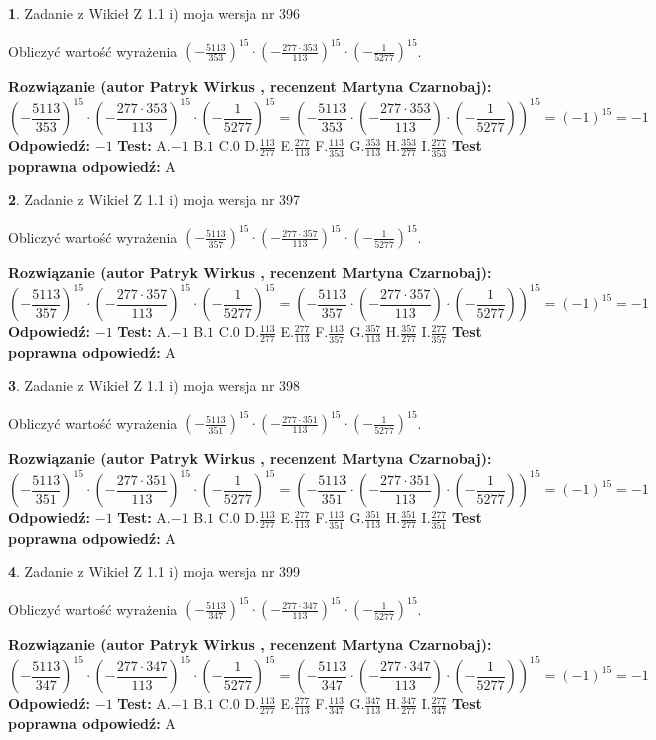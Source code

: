 \documentclass[12pt, a4paper]{article}
\theoremstyle{definition} %
\newtheorem{zad}{}
\newcommand{\zadStart}[1]{\begin{zad}#1\newline}
\newcommand{\zadStop}{\end{zad}}
\newcommand{\rozwStart}[2]{\noindent \textbf{Rozwiązanie (autor #1 , recenzent #2): }\newline}
\newcommand{\rozwStop}{\newline}
\newcommand{\odpStart}{\noindent \textbf{Odpowiedź:}\newline}
\newcommand{\odpStop}{\newline}
\newcommand{\testStart}{\noindent \textbf{Test:}\newline}
\newcommand{\testStop}{\newline}
\newcommand{\kluczStart}{\noindent \textbf{Test poprawna odpowiedź:}\newline}
\newcommand{\kluczStop}{\newline}
\begin{document}
\zadStart{Zadanie z Wikieł Z 1.1 i) moja wersja nr 396}

Obliczyć wartość wyrażenia $(-\frac{5113}{353})^{15} \cdot (-\frac{277 \cdot 353}{113})^{15} \cdot (-\frac{1}{5277})^{15}$.
\zadStop
\rozwStart{Patryk Wirkus}{Martyna Czarnobaj}
$$(-\frac{5113}{353})^{15} \cdot (-\frac{277 \cdot 353}{113})^{15} \cdot (-\frac{1}{5277})^{15} = (-\frac{5113}{353} \cdot (-\frac{277 \cdot 353}{113}) \cdot (-\frac{1}{5277}))^{15} = (-1)^{15} = -1$$
\rozwStop
\odpStart
$-1$
\odpStop
\testStart
A.$-1$ B.$1$ C.$0$ D.$\frac{113}{277}$ E.$\frac{277}{113}$
F.$\frac{113}{353}$ G.$\frac{353}{113}$
H.$\frac{353}{277}$
I.$\frac{277}{353}$
\testStop
\kluczStart
A
\kluczStop



\zadStart{Zadanie z Wikieł Z 1.1 i) moja wersja nr 397}

Obliczyć wartość wyrażenia $(-\frac{5113}{357})^{15} \cdot (-\frac{277 \cdot 357}{113})^{15} \cdot (-\frac{1}{5277})^{15}$.
\zadStop
\rozwStart{Patryk Wirkus}{Martyna Czarnobaj}
$$(-\frac{5113}{357})^{15} \cdot (-\frac{277 \cdot 357}{113})^{15} \cdot (-\frac{1}{5277})^{15} = (-\frac{5113}{357} \cdot (-\frac{277 \cdot 357}{113}) \cdot (-\frac{1}{5277}))^{15} = (-1)^{15} = -1$$
\rozwStop
\odpStart
$-1$
\odpStop
\testStart
A.$-1$ B.$1$ C.$0$ D.$\frac{113}{277}$ E.$\frac{277}{113}$
F.$\frac{113}{357}$ G.$\frac{357}{113}$
H.$\frac{357}{277}$
I.$\frac{277}{357}$
\testStop
\kluczStart
A
\kluczStop



\zadStart{Zadanie z Wikieł Z 1.1 i) moja wersja nr 398}

Obliczyć wartość wyrażenia $(-\frac{5113}{351})^{15} \cdot (-\frac{277 \cdot 351}{113})^{15} \cdot (-\frac{1}{5277})^{15}$.
\zadStop
\rozwStart{Patryk Wirkus}{Martyna Czarnobaj}
$$(-\frac{5113}{351})^{15} \cdot (-\frac{277 \cdot 351}{113})^{15} \cdot (-\frac{1}{5277})^{15} = (-\frac{5113}{351} \cdot (-\frac{277 \cdot 351}{113}) \cdot (-\frac{1}{5277}))^{15} = (-1)^{15} = -1$$
\rozwStop
\odpStart
$-1$
\odpStop
\testStart
A.$-1$ B.$1$ C.$0$ D.$\frac{113}{277}$ E.$\frac{277}{113}$
F.$\frac{113}{351}$ G.$\frac{351}{113}$
H.$\frac{351}{277}$
I.$\frac{277}{351}$
\testStop
\kluczStart
A
\kluczStop



\zadStart{Zadanie z Wikieł Z 1.1 i) moja wersja nr 399}

Obliczyć wartość wyrażenia $(-\frac{5113}{347})^{15} \cdot (-\frac{277 \cdot 347}{113})^{15} \cdot (-\frac{1}{5277})^{15}$.
\zadStop
\rozwStart{Patryk Wirkus}{Martyna Czarnobaj}
$$(-\frac{5113}{347})^{15} \cdot (-\frac{277 \cdot 347}{113})^{15} \cdot (-\frac{1}{5277})^{15} = (-\frac{5113}{347} \cdot (-\frac{277 \cdot 347}{113}) \cdot (-\frac{1}{5277}))^{15} = (-1)^{15} = -1$$
\rozwStop
\odpStart
$-1$
\odpStop
\testStart
A.$-1$ B.$1$ C.$0$ D.$\frac{113}{277}$ E.$\frac{277}{113}$
F.$\frac{113}{347}$ G.$\frac{347}{113}$
H.$\frac{347}{277}$
I.$\frac{277}{347}$
\testStop
\kluczStart
A
\kluczStop
\end{document}
